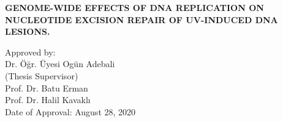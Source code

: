 \clearpage\pagebreak
\thispagestyle{empty} 
\onehalfspacing

\begin{tightcenter} 
\MakeUppercase{\textbf{GENOME-WIDE EFFECTS OF DNA REPLICATION ON
NUCLEOTIDE EXCISION REPAIR OF UV-INDUCED
DNA LESIONS.}}
\end{tightcenter}

\vspace{3\baselineskip}

Approved by:\\[3\baselineskip]
\setlength\parindent{1.25cm}
Dr. Öğr. Üyesi Ogün Adebali \dotfill \\
\indent (Thesis Supervisor) \\[2\baselineskip]
Prof. Dr. Batu Erman \dotfill \\[3\baselineskip]
Prof. Dr. Halil Kavaklı \dotfill \\[3\baselineskip]
\setlength\parindent{0cm}
Date of Approval: August 28, 2020

\clearpage\pagebreak
\thispagestyle{plain}